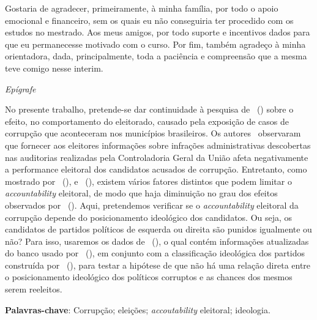 \documentclass[
	12pt,				%
	openright,			%
	twoside,			%
	a4paper,			%
	openany,
	english,			%
	brazil				%
	]{abntex2}
\begin{document}
\begin{agradecimentos}
Gostaria de agradecer, primeiramente, à minha família, por todo o apoio emocional e financeiro, sem os quais eu não conseguiria ter procedido com os estudos no mestrado. Aos meus amigos, por todo suporte e incentivos dados para que eu permanecesse motivado com o curso. Por fim, também agradeço à minha orientadora, dada, principalmente, toda a paciência e compreensão que a mesma teve comigo nesse interim.

\end{agradecimentos}

\begin{epigrafe}
    \vspace*{\fill}
	\begin{flushright}
		
		\textit{Epígrafe}

	\end{flushright}
\end{epigrafe}


\setlength{\absparsep}{18pt} %
\begin{resumo}

No presente trabalho, pretende-se dar continuidade à pesquisa de ~(\citeyear{ferraz2008exposing}) sobre o efeito, no comportamento do eleitorado, causado pela exposição de casos de corrupção que aconteceram nos municípios brasileiros. Os autores~\cite{ferraz2008exposing} observaram que fornecer aos eleitores informações sobre infrações administrativas descobertas nas auditorias realizadas pela Controladoria Geral da União afeta negativamente a performance eleitoral dos candidatos acusados de corrupção. Entretanto, como mostrado por ~(\citeyear{Botero2021Apr}), \cite{dunning2019voter} e ~(\citeyear{Boas2019Apr}), existem vários fatores distintos que podem limitar o \textit{accountability} eleitoral, de modo que haja diminuição no grau dos efeitos observados por ~(\citeyear{ferraz2008exposing}). Aqui, pretendemos verificar se o \textit{accountability} eleitoral da corrupção depende do posicionamento ideológico dos candidatos. Ou seja, os candidatos de partidos políticos de esquerda ou direita são punidos igualmente ou não? Para isso, usaremos os dados de ~(\citeyear{Brollo2013Aug}), o qual contém informações atualizadas do banco usado por ~(\citeyear{ferraz2008exposing}), em conjunto com a classificação ideológica dos partidos construída por ~(\citeyear{Bolognesi2022Sep}), para testar a hipótese de que não há uma relação direta entre o posicionamento ideológico dos políticos corruptos e as chances dos mesmos serem reeleitos.

\textbf{Palavras-chave}: Corrupção; eleições; \textit{accoutability} eleitoral; ideologia.

\end{resumo}
\end{document}
